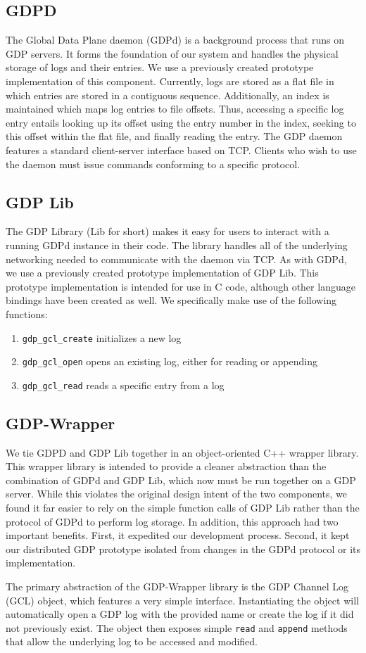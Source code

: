 \subsection{GDPD}
The Global Data Plane daemon (GDPd) is a background process that runs on GDP servers. It forms the foundation of our system and handles the physical storage of logs and their entries. We use a previously created prototype implementation of this component. Currently, logs are stored as a flat file in which entries are stored in a contiguous sequence. Additionally, an index is maintained which maps log entries to file offsets. Thus, accessing a specific log entry entails looking up its offset using the entry number in the index, seeking to this offset within the flat file, and finally reading the entry. The GDP daemon features a standard client-server interface based on TCP. Clients who wish to use the daemon must issue commands conforming to a specific protocol.

\subsection{GDP Lib}
The GDP Library (Lib for short) makes it easy for users to interact with a running GDPd instance in their code. The library handles all of the underlying networking needed to communicate with the daemon via TCP. As with GDPd, we use a previously created prototype implementation of GDP Lib. This prototype implementation is intended for use in C code, although other language bindings have been created as well. We specifically make use of the following functions:
\begin{enumerate}
\item \texttt{gdp\_gcl\_create} initializes a new log
\item \texttt{gdp\_gcl\_open} opens an existing log, either for reading or appending
\item \texttt{gdp\_gcl\_read} reads a specific entry from a log
\end{enumerate}

\subsection{GDP-Wrapper}
We tie GDPD and GDP Lib together in an object-oriented C++ wrapper library. This wrapper library is intended to provide a cleaner abstraction than the combination of GDPd and GDP Lib, which now must be run together on a GDP server. While this violates the original design intent of the two components, we found it far easier to rely on the simple function calls of GDP Lib rather than the protocol of GDPd to perform log storage. In addition, this approach had two important benefits. First, it expedited our development process. Second, it kept our distributed GDP prototype isolated from changes in the GDPd protocol or its implementation.

The primary abstraction of the GDP-Wrapper library is the GDP Channel Log (GCL) object, which features a very simple interface. Instantiating the object will automatically open a GDP log with the provided name or create the log if it did not previously exist. The object then exposes simple \texttt{read} and \texttt{append} methods that allow the underlying log to be accessed and modified.